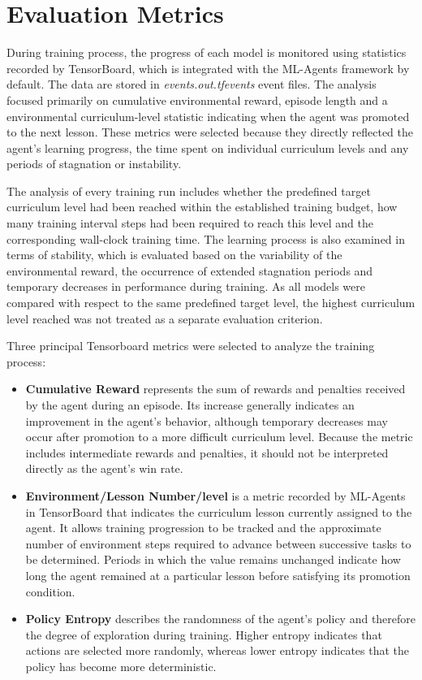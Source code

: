 \section{Evaluation Metrics}
\label{Env::metrics}
During training process, the progress of each model is monitored using statistics recorded by TensorBoard, which is integrated with the ML-Agents framework by default. The data are stored in \textit{events.out.tfevents} event files. The analysis focused primarily on cumulative environmental reward, episode length and a environmental curriculum-level statistic indicating when the agent was promoted to the next lesson. These metrics were selected because they directly reflected the agent's learning progress, the time spent on individual curriculum levels and any periods of stagnation or instability.

The analysis of every training run includes whether the predefined target curriculum level had been reached within the established training budget, how many training interval steps had been required to reach this level and the corresponding wall-clock training time. The learning process is also examined in terms of stability, which is evaluated based on the variability of the environmental reward, the occurrence of extended stagnation periods and temporary decreases in performance during training. As all models were compared with respect to the same predefined target level, the highest curriculum level reached was not treated as a separate evaluation criterion.

Three principal Tensorboard metrics were selected to analyze the training process:

\begin{itemize}
	\item \textbf{Cumulative Reward} represents the sum of rewards and penalties received by the agent during an episode. Its increase generally indicates an improvement in the agent's behavior, although temporary decreases may occur after promotion to a more difficult curriculum level. Because the metric includes intermediate rewards and penalties, it should not be interpreted directly as the agent's win rate.
	
	\item \textbf{Environment/Lesson Number/level} is a metric recorded by ML-Agents in TensorBoard that indicates the curriculum lesson currently assigned to the agent. It allows training progression to be tracked and the approximate number of environment steps required to advance between successive tasks to be determined. Periods in which the value remains unchanged indicate how long the agent remained at a particular lesson before satisfying its promotion condition.
	
	\item \textbf{Policy Entropy} describes the randomness of the agent's policy and therefore the degree of exploration during training. Higher entropy indicates that actions are selected more randomly, whereas lower entropy indicates that the policy has become more deterministic.
	
\end{itemize}


